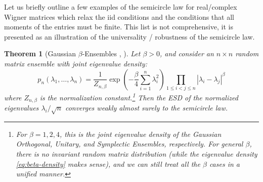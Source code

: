 \documentclass[letterpaper,11pt,oneside,reqno]{article}
\numberwithin{equation}{section}
\newtheorem{theorem}[proposition]{Theorem}
\theoremstyle{definition}
\begin{document}
Let us briefly outline a few examples
of the semicircle law for real/complex
Wigner matrices which relax the iid conditions and the
conditions that all moments of the entries must be finite.
This list is not comprehensive, it is presented as an illustration of the
universality / robustness of the semicircle law.
\begin{theorem}[Gaussian $\beta$-Ensembles \cite{Johansson_BGG_1998}, \cite{Forrester-LogGas}]
	Let $\beta > 0$, and consider an $n \times n$ random matrix ensemble with joint eigenvalue density:
\begin{equation}
	\label{eq:beta-density}
	p_n(\lambda_1,\ldots,\lambda_n) = \frac{1}{Z_{n,\beta}} \exp\left(-\frac{\beta}{4}\sum_{i=1}^n \lambda_i^2\right) \prod_{1\leq i<j\leq n} |\lambda_i-\lambda_j|^\beta
\end{equation}
where $Z_{n,\beta}$ is the normalization constant.\footnote{For
	$\beta=1,2,4$, this is the joint
eigenvalue density of the Gaussian Orthogonal, Unitary, and Symplectic Ensembles, respectively.
For general $\beta$, there is no invariant random matrix distribution
(while the eigenvalue density \eqref{eq:beta-density} makes sense), and
we can still treat all the $\beta$ cases in a unified manner.}
Then the ESD of the normalized eigenvalues $\lambda_i/\sqrt n$
converges weakly almost surely to the semicircle law.
\end{theorem}
\end{document}
